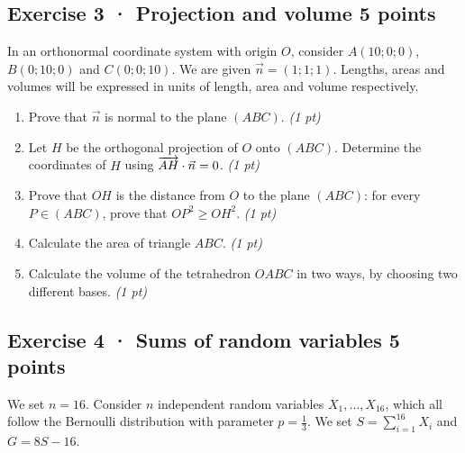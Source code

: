 \clearpage{}\par

\subsection*{Exercise 3 · Projection and volume \hfill 5 points}In an orthonormal coordinate system with origin $O$, consider $A(10;0;0)$, $B(0;10;0)$ and $C(0;0;10)$. We are given $\vec n=(1;1;1)$. Lengths, areas and volumes will be expressed in units of length, area and volume respectively.

\begin{enumerate}

\item Prove that $\vec n$ is normal to the plane $(ABC)$. \hfill\textit{(1 pt)}

\item Let $H$ be the orthogonal projection of $O$ onto $(ABC)$. Determine the coordinates of $H$ using $\overrightarrow{AH}\cdot\vec n=0$. \hfill\textit{(1 pt)}

\item Prove that $OH$ is the distance from $O$ to the plane $(ABC)$: for every $P\in(ABC)$, prove that $OP^2\ge OH^2$. \hfill\textit{(1 pt)}

\item Calculate the area of triangle $ABC$. \hfill\textit{(1 pt)}

\item Calculate the volume of the tetrahedron $OABC$ in two ways, by choosing two different bases. \hfill\textit{(1 pt)}

\end{enumerate}

\subsection*{Exercise 4 · Sums of random variables \hfill 5 points}We set $n=16$. Consider $n$ independent random variables $X_1,\ldots,X_{16}$, which all follow the Bernoulli distribution with parameter $p=\frac{1}{3}$. We set $S=\displaystyle\sum_{i=1}^{16}X_i$ and $G=8S-16$.

